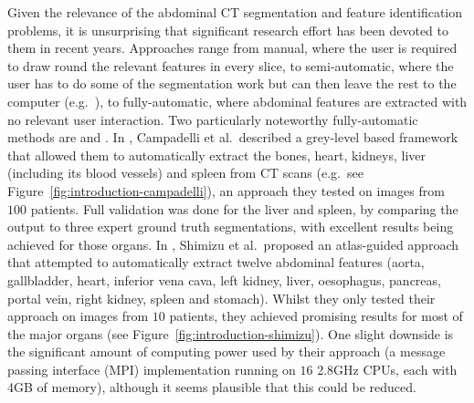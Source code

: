 Given the relevance of the abdominal CT segmentation and feature identification problems, it is unsurprising that significant research effort has been devoted to them in recent years. Approaches range from manual, where the user is required to draw round the relevant features in every slice, to semi-automatic, where the user has to do some of the segmentation work but can then leave the rest to the computer (e.g.~\cite{loncaric00}), to fully-automatic, where abdominal features are extracted with no relevant user interaction. Two particularly noteworthy fully-automatic methods are \cite{campadelli09} and \cite{shimizu07}. In \cite{campadelli09}, Campadelli et al.\ described a grey-level based framework that allowed them to automatically extract the bones, heart, kidneys, liver (including its blood vessels) and spleen from CT scans (e.g.~see Figure~\ref{fig:introduction-campadelli}), an approach they tested on images from $100$ patients. Full validation was done for the liver and spleen, by comparing the output to three expert ground truth segmentations, with excellent results being achieved for those organs. In \cite{shimizu07}, Shimizu et al.\ proposed an atlas-guided approach that attempted to automatically extract twelve abdominal features (aorta, gallbladder, heart, inferior vena cava, left kidney, liver, oesophagus, pancreas, portal vein, right kidney, spleen and stomach). Whilst they only tested their approach on images from $10$ patients, they achieved promising results for most of the major organs (see Figure~\ref{fig:introduction-shimizu}). One slight downside is the significant amount of computing power used by their approach (a message passing interface (MPI) implementation running on $16$ 2.8GHz CPUs, each with 4GB of memory), although it seems plausible that this could be reduced.


